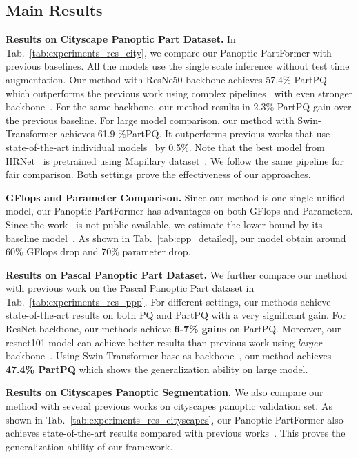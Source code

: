 \subsection{Main Results}

\noindent
\textbf{Results on Cityscape Panoptic Part Dataset.} In Tab.~\ref{tab:experiments_res_city}, we compare our Panoptic-PartFormer with previous baselines. All the models use the single scale inference without test time augmentation. Our method with ResNe50 backbone achieves 57.4\% PartPQ which outperforms the previous work using complex pipelines~\cite{deeplabv3plus,maskrcnn} with even stronger backbone~\cite{chollet2017xception}. For the same backbone, our method results in 2.3\% PartPQ gain over the previous baseline. 
For large model comparison, our method with Swin-Transformer achieves 61.9 \%PartPQ. It outperforms previous works that use state-of-the-art individual models~\cite{ocrnet,wang2020deep,Zhao2019BSANet,liang2020polytransform} by 0.5\%. Note that the best model from HRNet~\cite{ocrnet} is pretrained using Mapillary dataset~\cite{neuhold2017mapillary}.
We follow the same pipeline for fair comparison. Both settings prove the effectiveness of our approaches.

\noindent
\textbf{GFlops and Parameter Comparison.} Since our method is one single unified model, our Panoptic-PartFormer has advantages on both GFlops and Parameters. Since the work~\cite{liang2020polytransform} is not public available, we estimate the lower bound by its baseline model~\cite{maskrcnn}.
As shown in Tab.~\ref{tab:cpp_detailed}, our model obtain around 60\% GFlops drop and 70\% parameter drop.

\noindent
\textbf{Results on Pascal Panoptic Part Dataset.} We further compare our method with previous work on the Pascal Panoptic Part dataset in Tab.~\ref{tab:experiments_res_ppp}. For different settings, our methods achieve state-of-the-art results on both PQ and PartPQ with a very significant gain. For ResNet backbone, our methods achieve \textbf{6-7\% gains} on PartPQ. Moreover, our resnet101 model can achieve better results than previous work using \textit{larger} backbone~\cite{qiao2021detectors}.
Using Swin Transformer base as backbone~\cite{liu2021swin}, our method achieves \textbf{47.4\% PartPQ} which shows the generalization ability on large model. 


\noindent
\textbf{Results on Cityscapes Panoptic Segmentation.}
We also compare our method with several previous works on cityscapes panoptic validation set. As shown in Tab.~\ref{tab:experiments_res_cityscapes}, our Panoptic-PartFormer also achieves state-of-the-art results compared with previous works~\cite{li2020panopticFCN,cheng2020panoptic}. This proves the generalization ability of our framework. 

